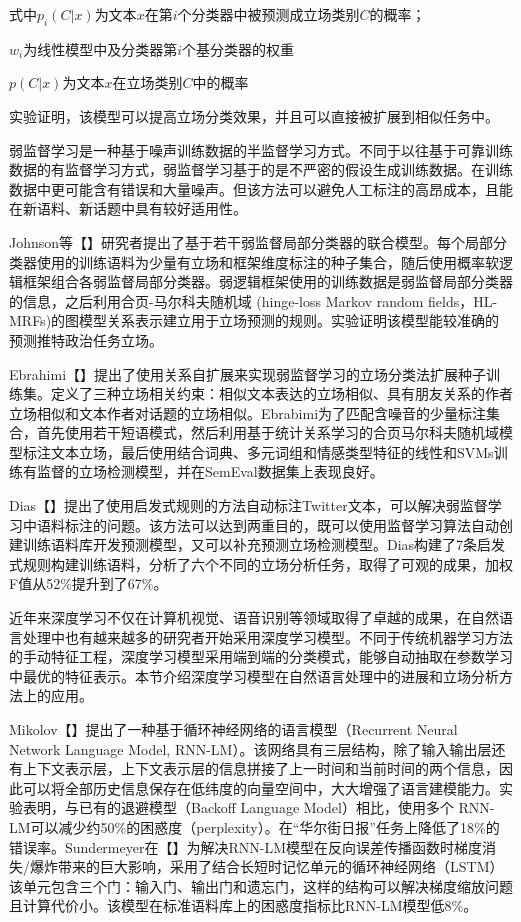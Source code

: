 式中$p_i(C|x)$为文本$x$在第$i$个分类器中被预测成立场类别$C$的概率；

$w_i$为线性模型中及分类器第$i$个基分类器的权重

$p(C|x)$为文本$x$在立场类别$C$中的概率

实验证明，该模型可以提高立场分类效果，并且可以直接被扩展到相似任务中。


弱监督学习是一种基于噪声训练数据的半监督学习方式。不同于以往基于可靠训练数据的有监督学习方式，弱监督学习基于的是不严密的假设生成训练数据。在训练数据中更可能含有错误和大量噪声。但该方法可以避免人工标注的高昂成本，且能在新语料、新话题中具有较好适用性。

Johnson等【】研究者提出了基于若干弱监督局部分类器的联合模型。每个局部分类器使用的训练语料为少量有立场和框架维度标注的种子集合，随后使用概率软逻辑框架组合各弱监督局部分类器。弱逻辑框架使用的训练数据是弱监督局部分类器的信息，之后利用合页-马尔科夫随机域 (hinge-loss Markov random fields，HL- MRFs)的图模型关系表示建立用于立场预测的规则。实验证明该模型能较准确的预测推特政治任务立场。

Ebrahimi【】提出了使用关系自扩展来实现弱监督学习的立场分类法扩展种子训练集。定义了三种立场相关约束：相似文本表达的立场相似、具有朋友关系的作者立场相似和文本作者对话题的立场相似。Ebrabimi为了匹配含噪音的少量标注集合，首先使用若干短语模式，然后利用基于统计关系学习的合页马尔科夫随机域模型标注文本立场，最后使用结合词典、多元词组和情感类型特征的线性和SVMs训练有监督的立场检测模型，并在SemEval数据集上表现良好。

Dias【】提出了使用启发式规则的方法自动标注Twitter文本，可以解决弱监督学习中语料标注的问题。该方法可以达到两重目的，既可以使用监督学习算法自动创建训练语料库开发预测模型，又可以补充预测立场检测模型。Dias构建了7条启发式规则构建训练语料，分析了六个不同的立场分析任务，取得了可观的成果，加权F值从52\%提升到了67\%。



近年来深度学习不仅在计算机视觉、语音识别等领域取得了卓越的成果，在自然语言处理中也有越来越多的研究者开始采用深度学习模型。不同于传统机器学习方法的手动特征工程，深度学习模型采用端到端的分类模式，能够自动抽取在参数学习中最优的特征表示。本节介绍深度学习模型在自然语言处理中的进展和立场分析方法上的应用。

Mikolov【】提出了一种基于循环神经网络的语言模型（Recurrent Neural Network Language Model, RNN-LM）。该网络具有三层结构，除了输入输出层还有上下文表示层，上下文表示层的信息拼接了上一时间和当前时间的两个信息，因此可以将全部历史信息保存在低纬度的向量空间中，大大增强了语言建模能力。实验表明，与已有的退避模型（Backoff Language Model）相比，使用多个 RNN-LM可以减少约50\%的困惑度（perplexity）。在“华尔街日报”任务上降低了18\%的错误率。Sundermeyer在【】为解决RNN-LM模型在反向误差传播函数时梯度消失/爆炸带来的巨大影响，采用了结合长短时记忆单元的循环神经网络（LSTM）该单元包含三个门：输入门、输出门和遗忘门，这样的结构可以解决梯度缩放问题且计算代价小。该模型在标准语料库上的困惑度指标比RNN-LM模型低8\%。

